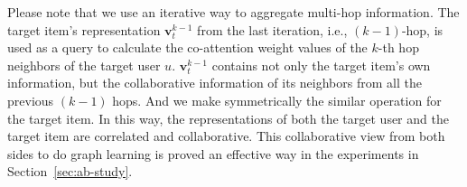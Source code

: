 Please note that we use an iterative way to aggregate multi-hop information. The target item's representation $\bm{v}_t^{k-1}$ from the last iteration, i.e., $(k - 1)$-hop, is used as a query to calculate the co-attention weight values of the $k$-th hop neighbors of the target user $u$. 
$\bm{v}_t^{k-1}$ contains not only the target item's own information, but the collaborative information of its neighbors from all the previous $(k - 1)$ hops.
And we make symmetrically the similar operation for the target item.
In this way, the representations of both the target user and the target item are correlated and collaborative. This collaborative view from both sides to do graph learning is proved an effective way in the experiments in Section~\ref{sec:ab-study}.




